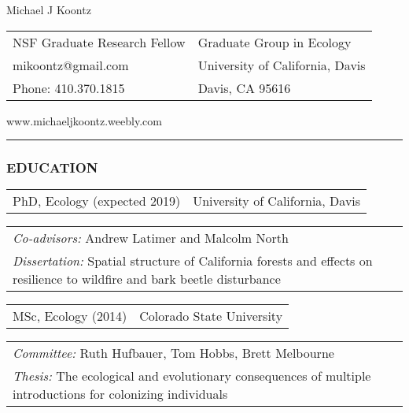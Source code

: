 \documentclass[11pt,english]{article}
\providecommand{\tabularnewline}{\\}
\begin{document}
\begin {center}
{\huge Michael J Koontz}\tabularnewline
\vspace{1em}

\begin{tabular}{>{\raggedright}p{3in}>{\raggedleft}p{3in}}
NSF Graduate Research Fellow & Graduate Group in Ecology\tabularnewline
mikoontz@gmail.com & University of California, Davis\tabularnewline
Phone: 410.370.1815 & Davis, CA 95616\tabularnewline
\end{tabular}
www.michaeljkoontz.weebly.com
\end{center}
\vspace{-1.5em}

\rule[0.5ex]{1\columnwidth}{0.5pt}


\subsubsection*{EDUCATION}
\vspace{-0.5ex}

\begin{tabular}{>{\raggedright}p{4in}>{\raggedleft}p{2in}}
PhD, Ecology (expected 2019) & University of California, Davis\tabularnewline
\end{tabular}

\hspace{1.0em}
\begin{tabular}{p{6in}p{0in}}
\emph{Co-advisors:} Andrew Latimer and Malcolm North & \tabularnewline
\emph{Dissertation:} Spatial structure of California forests and effects on resilience to wildfire and bark beetle disturbance &
\end{tabular}

\vspace{0.5ex}

\begin{tabular}{>{\raggedright}p{4in}>{\raggedleft}p{2in}}
MSc, Ecology (2014) & Colorado State University\tabularnewline
\end{tabular}

\hspace{1.0em}
\begin{tabular}{p{6in}p{0in}}
\emph{Committee:} Ruth Hufbauer, Tom Hobbs, Brett Melbourne & \tabularnewline
\emph{Thesis:} The ecological and evolutionary consequences of multiple introductions for colonizing individuals &
\end{tabular}
\end{document}
